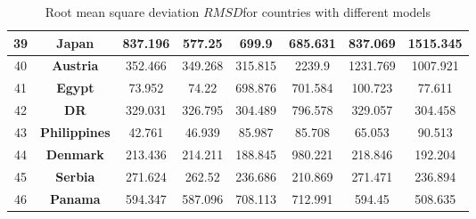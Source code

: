 \begin{table*}
\begin{center}
\begin{tiny}
\begin{tabular}{|c|c|c|c|c|c|c|c|}
39 & {\bf Japan} & 837.196 & 577.25 & 699.9 & 685.631 & 837.069 & 1515.345\\ \hline
40 & {\bf Austria} & 352.466 & 349.268 & 315.815 & 2239.9 & 1231.769 & 1007.921\\ \hline
41 & {\bf Egypt} & 73.952 & 74.22 & 698.876 & 701.584 & 100.723 & 77.611\\ \hline
42 & {\bf DR} & 329.031 & 326.795 & 304.489 & 796.578 & 329.057 & 304.458\\ \hline
43 & {\bf Philippines} & 42.761 & 46.939 & 85.987 & 85.708 & 65.053 & 90.513\\ \hline
44 & {\bf Denmark} & 213.436 & 214.211 & 188.845 & 980.221 & 218.846 & 192.204\\ \hline
45 & {\bf Serbia} & 271.624 & 262.52 & 236.686 & 210.869 & 271.471 & 236.894\\ \hline
46 & {\bf Panama} & 594.347 & 587.096 & 708.113 & 712.991 & 594.45 & 508.635\\ \hline
\end{tabular}
\caption{Root mean square deviation $RMSD$for countries with different models
}
\label{RMSD}
\end{tiny}
\end{center}
\end{table*}
